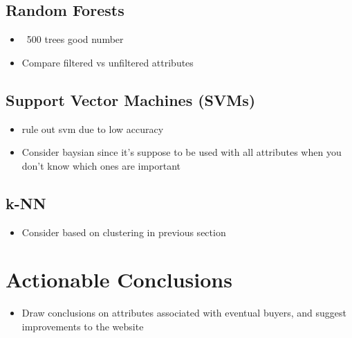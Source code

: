 \documentclass[
  draft,
]{memreport}
\begin{document}
  \section{Random Forests}
  \begin{itemize}
    \item ~500 trees good number
    \item Compare filtered vs unfiltered attributes
  \end{itemize}

  \section{Support Vector Machines (SVMs)}
  \begin{itemize}
    \item rule out svm due to low accuracy
    \item Consider baysian since it's suppose to be used with all attributes when you don't know which ones are important
  \end{itemize}

  \section{k-NN}
  \begin{itemize}
    \item Consider based on clustering in previous section
  \end{itemize}

  \chapter{Actionable Conclusions}
  \begin{itemize}
    \item Draw conclusions on attributes associated with eventual buyers, and suggest improvements to the website
  \end{itemize}
\end{document}
